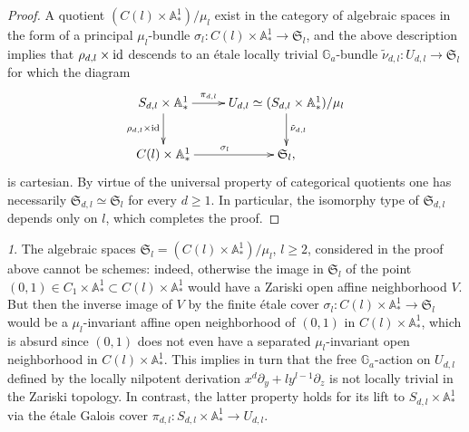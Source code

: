 \documentclass[10pt,oneside,english]{amsart}
\numberwithin{equation}{section}
\numberwithin{figure}{section}
\theoremstyle{plain}
\theoremstyle{remark}
\newtheorem{rem}[thm]{\protect\remarkname}
\theoremstyle{plain}
\theoremstyle{plain}
\theoremstyle{definition}
\providecommand{\remarkname}{Remark}
\begin{document}
\begin{proof}
A quotient $(C(l)\times\mathbb{A}_{*}^{1})/\mu_{l}$ exist in the
category of algebraic spaces in the form of a principal $\mu_{l}$-bundle
$\sigma_{l}:C(l)\times\mathbb{A}_{*}^{1}\rightarrow\mathfrak{S}_{l}$,
and the above description implies that $\rho_{d,l}\times{\rm id}$
descends to an \'etale locally trivial $\mathbb{G}_{a}$-bundle $\tilde{\nu}_{d,l}:U_{d,l}\rightarrow\mathfrak{S}_{l}$
for which the diagram \[\xymatrix{S_{d,l}\times \mathbb{A}^1_* \ar[d]_-{\rho_{d,l}\times {\rm id}} \ar[r]^-{\pi_{d,l}} & U_{d,l}\simeq (S_{d,l}\times \mathbb{A}^1_*)/\mu_l \ar[d]^{\tilde{\nu}_{d,l}} \\ C(l)\times \mathbb{A}^1_* \ar[r]^{\sigma_l} & \mathfrak{S}_l,} \] is
cartesian. By virtue of the universal property of categorical quotients
one has necessarily $\mathfrak{S}_{d,l}\simeq\mathfrak{S}_{l}$ for
every $d\geq1$. In particular, the isomorphy type of $\mathfrak{S}_{d,l}$
depends only on $l$, which completes the proof. \end{proof}
\begin{rem}
The algebraic spaces $\mathfrak{S}_{l}=(C\left(l\right)\times\mathbb{A}_{*}^{1})/\mu_{l}$,
$l\geq2$, considered in the proof above cannot be schemes: indeed,
otherwise the image in $\mathfrak{S}_{l}$ of the point $\left(0,1\right)\in C_{1}\times\mathbb{A}_{*}^{1}\subset C\left(l\right)\times\mathbb{A}_{*}^{1}$
would have a Zariski open affine neighborhood $V$. But then the inverse
image of $V$ by the finite \'etale cover $\sigma_{l}:C\left(l\right)\times\mathbb{A}_{*}^{1}\rightarrow\mathfrak{S}_{l}$
would be a $\mu_{l}$-invariant affine open neighborhood of $\left(0,1\right)$
in $C\left(l\right)\times\mathbb{A}_{*}^{1}$, which is absurd since
$\left(0,1\right)$ does not even have a separated $\mu_{l}$-invariant
open neighborhood in $C\left(l\right)\times\mathbb{A}_{*}^{1}$. This
implies in turn that the free $\mathbb{G}_{a}$-action on $U_{d,l}$
defined by the locally nilpotent derivation $x^{d}\partial_{y}+ly^{l-1}\partial_{z}$
is not locally trivial in the Zariski topology. In contrast, the latter
property holds for its lift to $S_{d,l}\times\mathbb{A}_{*}^{1}$
via the \'etale Galois cover $\pi_{d,l}:S_{d,l}\times\mathbb{A}_{*}^{1}\rightarrow U_{d,l}$. 
\end{rem}
\noindent 
\end{document}
